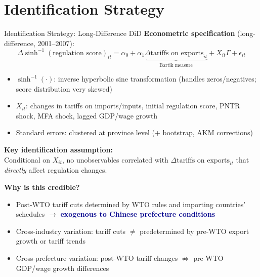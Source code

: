 \documentclass[10pt,aspectratio=169,t]{beamer}
\newcommand{\hlight}[1]{\textcolor{darkblue}{\textbf{#1}}}
\newcommand{\asinh}{\operatorname{sinh}^{-1}}
\begin{document}
\section{Identification Strategy}

\begin{frame}{Identification Strategy: Long-Difference DiD}
\textbf{Econometric specification} (long-difference, 2001--2007):
\begin{equation*}
\boxed{\Delta\asinh(\text{regulation score})_{it} = \alpha_0 + \alpha_1 \underbrace{\Delta\text{tariffs on exports}_{it}}_{\text{Bartik measure}} + X_{it}\Gamma + \epsilon_{it}}
\end{equation*}

\medskip
\begin{itemize}
    \item $\asinh(\cdot)$: inverse hyperbolic sine transformation (handles zeros/negatives; score distribution very skewed)
    \item $X_{it}$: changes in tariffs on imports/inputs, initial regulation score, PNTR shock, MFA shock, lagged GDP/wage growth
    \item Standard errors: clustered at province level (+ bootstrap, AKM corrections)
\end{itemize}

\bigskip
\textbf{Key identification assumption:}\\[4pt]
Conditional on $X_{it}$, no unobservables correlated with $\Delta\text{tariffs on exports}_{it}$ that \textit{directly} affect regulation changes.

\bigskip
\textbf{Why is this credible?}
\begin{itemize}
    \item Post-WTO tariff cuts determined by WTO rules and importing countries' schedules $\rightarrow$ \hlight{exogenous to Chinese prefecture conditions}
    \item Cross-industry variation: tariff cuts $\neq$ predetermined by pre-WTO export growth or tariff trends
    \item Cross-prefecture variation: post-WTO tariff changes $\not\Rightarrow$ pre-WTO GDP/wage growth differences
\end{itemize}
\end{frame}
\end{document}
